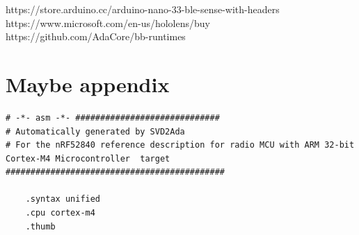 \documentclass{article}
\begin{document}
https://store.arduino.cc/arduino-nano-33-ble-sense-with-headers\\
https://www.microsoft.com/en-us/hololens/buy\\
https://github.com/AdaCore/bb-runtimes

\section{Maybe appendix}

\begin{lstlisting}
# -*- asm -*- #############################
# Automatically generated by SVD2Ada
# For the nRF52840 reference description for radio MCU with ARM 32-bit Cortex-M4 Microcontroller  target
############################################

	.syntax unified
	.cpu cortex-m4
	.thumb


\end{lstlisting}
\end{document}
